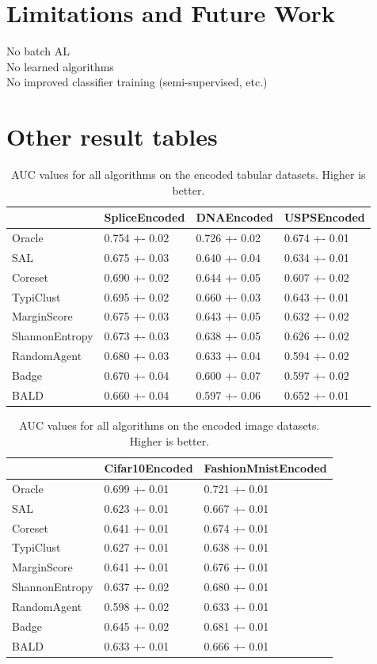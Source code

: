 \documentclass[]{article}
\begin{document}
\section{Limitations and Future Work}
No batch AL \\
No learned algorithms \\
No improved classifier training (semi-supervised, etc.)

\newpage


 

\appendix

\section{Other result tables}
\begin{table}[H]
	\begin{tabular}{l|lll}
		& SpliceEncoded & DNAEncoded    & USPSEncoded   \\
		\hline
		Oracle          & 0.754 +- 0.02 & 0.726 +- 0.02 & 0.674 +- 0.01 \\
		SAL & 0.675 +- 0.03 & 0.640 +- 0.04 & 0.634 +- 0.01 \\
		Coreset & 0.690 +- 0.02 & 0.644 +- 0.05 & 0.607 +- 0.02 \\
		TypiClust       & 0.695 +- 0.02 & 0.660 +- 0.03 & 0.643 +- 0.01 \\
		MarginScore     & 0.675 +- 0.03 & 0.643 +- 0.05 & 0.632 +- 0.02 \\
		ShannonEntropy  & 0.673 +- 0.03 & 0.638 +- 0.05 & 0.626 +- 0.02 \\
		RandomAgent     & 0.680 +- 0.03 & 0.633 +- 0.04 & 0.594 +- 0.02 \\
		Badge           & 0.670 +- 0.04 & 0.600 +- 0.07 & 0.597 +- 0.02 \\
		BALD            & 0.660 +- 0.04 & 0.597 +- 0.06 & 0.652 +- 0.01
	\end{tabular}
	\caption{AUC values for all algorithms on the encoded tabular datasets. Higher is better.}
\end{table}
%
\begin{table}[H]
	\begin{tabular}{l|ll}
		& Cifar10Encoded & FashionMnistEncoded \\
		\hline
		Oracle          & 0.699 +- 0.01  & 0.721 +- 0.01       \\
		SAL & 0.623 +- 0.01  & 0.667 +- 0.01       \\
		Coreset & 0.641 +- 0.01  & 0.674 +- 0.01       \\
		TypiClust       & 0.627 +- 0.01  & 0.638 +- 0.01       \\
		MarginScore     & 0.641 +- 0.01  & 0.676 +- 0.01       \\
		ShannonEntropy  & 0.637 +- 0.02  & 0.680 +- 0.01       \\
		RandomAgent     & 0.598 +- 0.02  & 0.633 +- 0.01       \\
		Badge           & 0.645 +- 0.02  & 0.681 +- 0.01       \\
		BALD            & 0.633 +- 0.01  & 0.666 +- 0.01      
	\end{tabular}
	\caption{AUC values for all algorithms on the encoded image datasets. Higher is better.}
\end{table}
\end{document}
